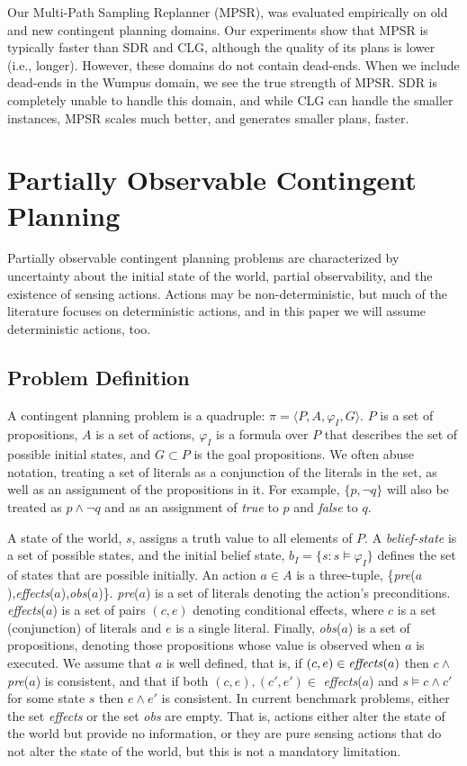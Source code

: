 \documentclass[letterpaper]{article}
\numberwithin{equation}{section}	%
\begin{document}
Our Multi-Path Sampling Replanner (MPSR), was evaluated empirically on old
and new contingent planning domains. Our experiments show that MPSR is typically faster than SDR and CLG, although
the quality of its plans is lower (i.e., longer). However, these domains do not contain dead-ends. When we include dead-ends
in the Wumpus domain, we see the true strength of MPSR. SDR is completely unable to handle this domain, and while CLG
can handle the smaller instances, MPSR scales much better, and generates smaller plans, faster.

\section{Partially Observable Contingent Planning}
Partially observable contingent planning problems are characterized by uncertainty about the initial state of the world,
partial observability, and the existence of sensing actions. Actions may be non-deterministic,
but much of the literature focuses on deterministic actions, and in this paper we will
assume deterministic actions, too.

\subsection{Problem Definition}
A contingent planning problem is a quadruple: $\pi=\langle P,A,\varphi_I,G \rangle$. $P$ is a set of propositions, $A$ is a set of actions, $\varphi_I$ is a formula over $P$ that describes the set of possible initial states, and $G\subset P$ is the goal propositions. We often abuse notation, treating a set of literals as a conjunction of the literals in the set, as well as an assignment of the propositions in it. For example, $\{p, \neg q\}$ will also be treated as $p\wedge\neg q$ and as an assignment of \emph{true} to $p$ and \emph{false} to $q$.

A state of the world, $s$, assigns a truth value to all elements of $P$.
A \emph{belief-state} is a set of possible states, and the initial belief state, $b_I = \{s : s\models\varphi_I\}$ defines the set of states that are possible initially. An action $a\in A$ is a three-tuple, \{\emph{pre}($a$),\emph{effects}($a$),\emph{obs}($a$)\}.
\emph{pre}($a$) is a set of literals denoting the action's preconditions. \emph{effects}($a$) is a set of pairs $(c,e)$ denoting conditional effects, where $c$ is a set (conjunction) of literals and $e$ is a single literal.
Finally, \emph{obs}($a$) is a set of propositions, denoting those propositions whose value is observed when $a$ is executed.
We assume that $a$ is well defined, that is, if $(c,e)\in\mbox{\emph{effects}}(a)$ then $c \wedge $\emph{pre}($a$)
is consistent, and that if both $(c,e),(c',e')\in $ \emph{effects}($a$) and $s\models c\wedge c'$ for some state $s$
then $e\wedge e'$ is consistent.
In current benchmark problems, either the set \emph{effects} or the set \emph{obs} are empty. That is, actions either alter the state of the world but provide no information, or they are pure sensing actions that do not alter the state of the world, but this is not a mandatory limitation.
\end{document}
